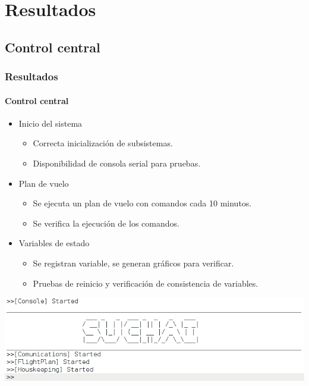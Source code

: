 \documentclass[xcolor=dvipsnames]{beamer}
\begin{document}
    \section{Resultados}
    \subsection{Control central}
    \begin{frame}[squeeze]
        \frametitle{Resultados}
        \framesubtitle{Control central}
        
        \begin{itemize}
            \item Inicio del sistema
                \begin{itemize}
                    \item Correcta inicialización de subsistemas.
                    \item Disponibilidad de consola serial para pruebas.
                \end{itemize}
            \item Plan de vuelo
            \begin{itemize}
                \item Se ejecuta un plan de vuelo con comandos cada 10 minutos.
                \item Se verifica la ejecución de los comandos.
            \end{itemize}
            \item Variables de estado
            \begin{itemize}
                \item Se registran variable, se generan gráficos para verificar.
                \item Pruebas de reinicio y verificación de consistencia de variables.
            \end{itemize}
        \end{itemize}
        
        \begin{center}
            \includegraphics[height=0.35\textheight]{img/prompt.png}
        \end{center}

    \end{frame}
    
\end{document}
